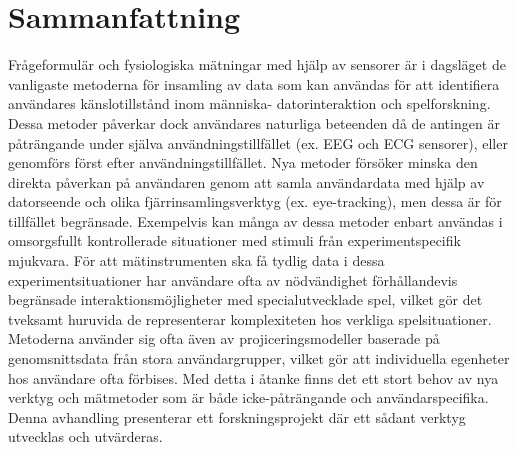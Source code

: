 \chapter*{Sammanfattning}

Fr{\aa}geformul{\"a}r och fysiologiska m{\"a}tningar med hj{\"a}lp av sensorer {\"a}r i dagsl{\"a}get de vanligaste metoderna f{\"o}r insamling av data som kan anv{\"a}ndas f{\"o}r att identifiera anv{\"a}ndares k{\"a}nslotillst{\aa}nd inom m{\"a}nniska- datorinteraktion och spelforskning. Dessa metoder p{\aa}verkar dock anv{\"a}ndares naturliga beteenden d{\aa} de antingen {\"a}r p{\aa}tr{\"a}ngande under sj{\"a}lva anv{\"a}ndningstillf{\"a}llet (ex. EEG och ECG sensorer), eller genomf{\"o}rs f{\"o}rst efter anv{\"a}ndningstillf{\"a}llet. Nya metoder f{\"o}rs{\"o}ker minska den direkta p{\aa}verkan p{\aa} anv{\"a}ndaren genom att samla anv{\"a}ndardata med hj{\"a}lp av datorseende och olika fj{\"a}rrinsamlingsverktyg (ex. eye-tracking), men dessa {\"a}r f{\"o}r tillf{\"a}llet begr{\"a}nsade. Exempelvis kan m{\aa}nga av dessa metoder enbart anv{\"a}ndas i omsorgsfullt kontrollerade situationer med stimuli fr{\aa}n experimentspecifik mjukvara. F{\"o}r att m{\"a}tinstrumenten ska f{\aa} tydlig data i dessa experimentsituationer har anv{\"a}ndare ofta av n{\"o}dv{\"a}ndighet f{\"o}rh{\aa}llandevis begr{\"a}nsade interaktionsm{\"o}jligheter med specialutvecklade spel, vilket g{\"o}r det tveksamt huruvida de representerar komplexiteten hos verkliga spelsituationer. Metoderna anv{\"a}nder sig ofta {\"a}ven av projiceringsmodeller baserade p{\aa} genomsnittsdata fr{\aa}n stora anv{\"a}ndargrupper, vilket g{\"o}r att individuella egenheter hos anv{\"a}ndare ofta f{\"o}rbises. Med detta i {\aa}tanke finns det ett stort behov av nya verktyg och m{\"a}tmetoder som {\"a}r b{\aa}de icke-p{\aa}tr{\"a}ngande och anv{\"a}ndarspecifika. Denna avhandling presenterar ett forskningsprojekt d{\"a}r ett s{\aa}dant verktyg utvecklas och utv{\"a}rderas.

